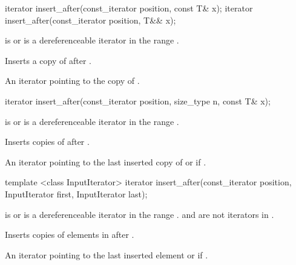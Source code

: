\begin{itemdescr}
\pnum
\effects {}
\end{itemdescr}

%
%
\begin{itemdecl}
iterator insert_after(const_iterator position, const T& x);
iterator insert_after(const_iterator position, T&& x);
\end{itemdecl}

\begin{itemdescr}
\pnum
\requires {} is  or is a dereferenceable
iterator in the range .

\pnum
\effects Inserts a copy of  after .

\pnum
\returns An iterator pointing to the copy of .
\end{itemdescr}

%
%
\begin{itemdecl}
iterator insert_after(const_iterator position, size_type n, const T& x);
\end{itemdecl}

\begin{itemdescr}
\pnum
\requires {} is  or is a dereferenceable
iterator in the range .

\pnum
\effects Inserts  copies of  after .

\pnum
\returns
An iterator pointing to the last inserted copy of  or  if .
\end{itemdescr}

%
%
\begin{itemdecl}
template <class InputIterator>
  iterator insert_after(const_iterator position, InputIterator first, InputIterator last);
\end{itemdecl}

\begin{itemdescr}
\pnum
\requires {} is  or is a dereferenceable
iterator in the range .
 and  are not iterators in .

\pnum
\effects Inserts copies of elements in  after .

\pnum
\returns
An iterator pointing to the last inserted element or  if .
\end{itemdescr}

